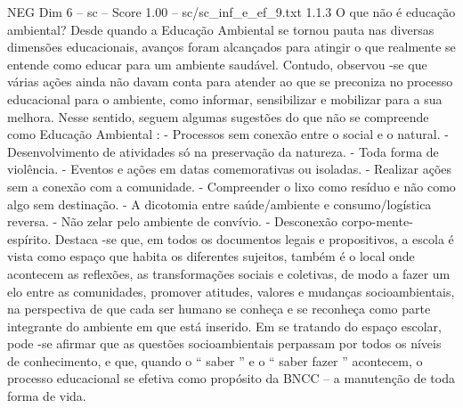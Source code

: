 \begin{textsample}{NEG Dim 6 – sc – Score 1.00 – sc/sc\_inf\_e\_ef\_9.txt}  \label{ex:f6_neg_273}
1.1.3 O que não é educação ambiental?
Desde quando a Educação Ambiental se tornou pauta nas diversas dimensões educacionais, avanços foram alcançados para atingir o que realmente se entende como educar para um ambiente saudável.
Contudo, observou -se que várias ações ainda não davam conta para atender ao que se preconiza no processo educacional para o ambiente, como informar, sensibilizar e mobilizar para a sua melhora.
Nesse sentido, seguem algumas sugestões do que não se compreende como Educação Ambiental : - Processos sem conexão entre o social e o natural. - Desenvolvimento de atividades só na preservação da natureza. - Toda forma de violência. - Eventos e ações em datas comemorativas ou isoladas. - Realizar ações sem a conexão com a comunidade. - Compreender o lixo como resíduo e não como algo sem destinação. - A dicotomia entre saúde/ambiente e consumo/logística reversa. - Não zelar pelo ambiente de convívio. - Desconexão corpo-mente-espírito.
Destaca -se que, em todos os documentos legais e propositivos, a escola é vista como espaço que habita os diferentes sujeitos, também é o local onde acontecem as reflexões, as transformações sociais e coletivas, de modo a fazer um elo entre as comunidades, promover atitudes, valores e mudanças socioambientais, na perspectiva de que cada ser humano se conheça e se reconheça como parte integrante do ambiente em que está inserido.
Em se tratando do espaço escolar, pode -se afirmar que as questões socioambientais perpassam por todos os níveis de conhecimento, e que, quando o “ saber ” e o “ saber fazer ” acontecem, o processo educacional se efetiva como propósito da BNCC – a manutenção de toda forma de vida.

\end{textsample}
